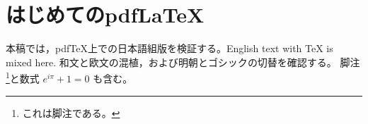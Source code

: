 \documentclass[pdflatex]{jlreq}
\begin{document}
\section{はじめてのpdfLaTeX}
本稿では，pdfTeX上での日本語組版を検証する。English text with \TeX{} is mixed here.
和文と欧文の混植，および{\mcfamily 明朝}と{\gtfamily ゴシック}の切替を確認する。
脚注\footnote{これは脚注である。}と数式 $e^{i\pi}+1=0$ も含む。
\end{document}
